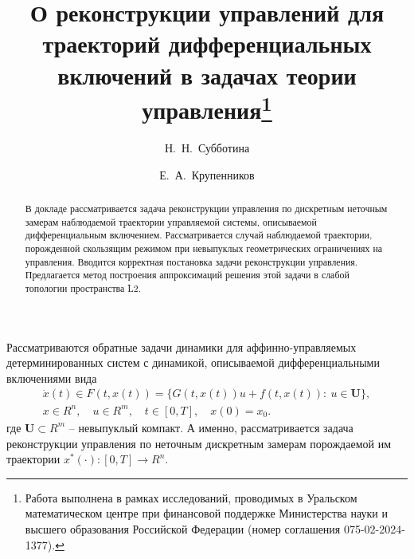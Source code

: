 \fi

\title{О реконструкции управлений для траекторий дифференциальных включений в задачах теории управления\thanks{Работа выполнена в рамках исследований, проводимых в Уральском математическом центре при финансовой поддержке Министерства науки и высшего образования Российской Федерации (номер соглашения 075-02-2024-1377).}}
\author{Н.~Н.~Субботина \and  Е.~А.~Крупенников
  \and
}


\maketitle

\begin{abstract}
В докладе рассматривается задача реконструкции управления по дискретным неточным замерам наблюдаемой траектории управляемой системы, описываемой дифференциальным включением.
Рассматривается случай наблюдаемой траектории, порожденной скользящим
режимом при невыпуклых геометрических ограничениях на управления. Вводится корректная постановка задачи реконструкции управления. Предлагается метод построения аппроксимаций решения этой задачи в слабой топологии пространства L2.

\end{abstract}


Рассматриваются обратные задачи динамики для аффинно-управляемых
детерминированных систем с динамикой, описываемой дифференциальными включениями вида
\begin{equation}\label{Krupennikov:dyn}
\begin{gathered}
\dot x(t)\in F(t,x(t))=\{G(t,x(t))u + f(t,x(t)):\ u\in \mathbf{U}\},\\
x\in R^n,\quad u\in R^m,\quad t\in[0,T],\quad x(0)=x_0.
\end{gathered}
\end{equation}
где $\mathbf{U}\subset R^m$ -- невыпуклый компакт. А именно, рассматривается задача реконструкции управления по неточным дискретным замерам порождаемой
им траектории $x^*(\cdot):[0,T]\to R^n$.

